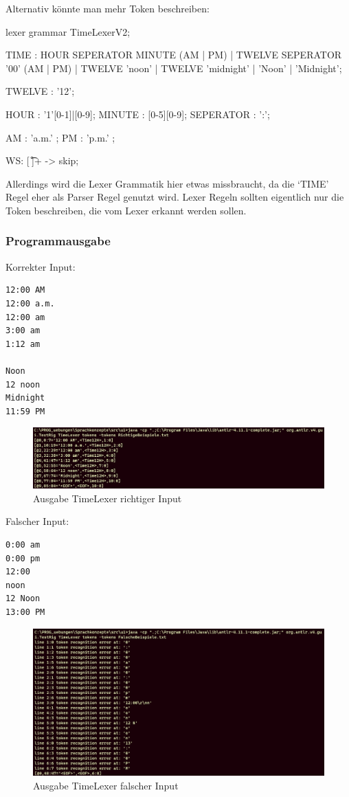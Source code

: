 \newpage

Alternativ könnte man mehr Token beschreiben:
\begin{code}[language=antlr, caption={alternativer Lexer}, label={lst:Aufgabe1bV2}]
    lexer grammar TimeLexerV2;

    TIME : HOUR SEPERATOR MINUTE (AM | PM)
    | TWELVE SEPERATOR '00' (AM | PM)
    | TWELVE 'noon'
    | TWELVE 'midnight'
    | 'Noon'
    | 'Midnight';

    TWELVE : '12';

    HOUR : '1'[0-1]|[0-9];
    MINUTE : [0-5][0-9];
    SEPERATOR : ':';

    AM : 'a.m.' ;
    PM : 'p.m.' ;

    WS: [ \t\r\n]+ -> skip;
\end{code}
Allerdings wird die Lexer Grammatik hier etwas missbraucht, da die `TIME' Regel eher als Parser Regel genutzt wird.
Lexer Regeln sollten eigentlich nur die Token beschreiben, die vom Lexer erkannt werden sollen. \newline


\subsubsection{Programmausgabe}

Korrekter Input:
\begin{verbatim}
12:00 AM
12:00 a.m.
12:00 am
3:00 am
1:12 am

Noon
12 noon
Midnight
11:59 PM
\end{verbatim}

\begin{figure}[H]
	\includegraphics[width=\textwidth]{media/Aufgabe1b_correct_test}
	\caption{Ausgabe TimeLexer richtiger Input}
	\label{img:Aufgabe1b_correct_test}
\end{figure}

Falscher Input:
\begin{verbatim}
0:00 am
0:00 pm
12:00
noon
12 Noon
13:00 PM
\end{verbatim}

\begin{figure}[H]
	\includegraphics[width=\textwidth]{media/Aufgabe1b_wrong_test}
	\caption{Ausgabe TimeLexer falscher Input}
	\label{img:Aufgabe1b_wrong_test}
\end{figure}


\newpage